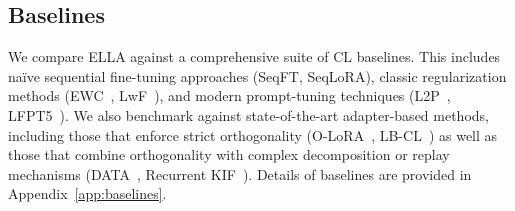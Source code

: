 \documentclass[11pt]{article}
\begin{document}
\subsection{Baselines} We compare ELLA against a comprehensive suite of CL baselines. This includes naïve sequential fine-tuning approaches (SeqFT, SeqLoRA), classic regularization methods (EWC~\cite{kirkpatrick2017overcoming}, LwF~\cite{li2017learning}), and modern prompt-tuning techniques (L2P~\cite{wang2022learning}, LFPT5~\cite{qin2021lfpt5}). We also benchmark against state-of-the-art adapter-based methods, including those that enforce strict orthogonality (O-LoRA~\cite{wang2023orthogonal}, LB-CL~\cite{qiao2024learn}) as well as those that combine orthogonality with complex decomposition or replay mechanisms (DATA~\cite{liao2025data}, Recurrent KIF~\cite{feng2025recurrent}). 
Details of baselines are provided in Appendix~\ref{app:baselines}.
\end{document}
